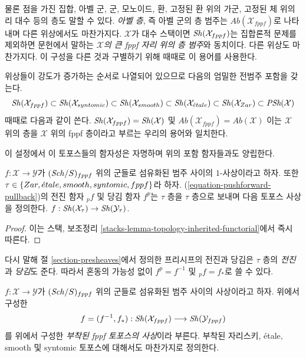 \noindent
물론 점을 가진 집합, 아벨 군, 군, 모노이드, 환, 고정된 환 위의
가군, 고정된 체 위의 리 대수 등의 층도 말할 수 있다. {\it 아벨 층},
즉 아벨 군의 층 범주는 $\textit{Ab}(\mathcal{X}_{fppf})$로 나타내며
다른 위상에서도 마찬가지다. $\mathcal{X}$가 대수 스택이면
$\mathop{\mathit{Sh}}\nolimits(\mathcal{X}_{fppf})$는 집합론적 문제를 제외하면 문헌에서
말하는 {\it $\mathcal{X}$의 큰 fppf 자리 위의 층 범주}와 동치이다.
다른 위상도 마찬가지다. 이 구성을 다른 것과 구별하기 위해 때때로
이 용어를 사용한다.

\medskip\noindent
위상들이 강도가 증가하는 순서로 나열되어 있으므로 다음의 엄밀한
전범주 포함을 갖는다.
$$
\mathop{\mathit{Sh}}\nolimits(\mathcal{X}_{fppf}) \subset
\mathop{\mathit{Sh}}\nolimits(\mathcal{X}_{syntomic}) \subset
\mathop{\mathit{Sh}}\nolimits(\mathcal{X}_{smooth}) \subset
\mathop{\mathit{Sh}}\nolimits(\mathcal{X}_{\acute{e}tale}) \subset
\mathop{\mathit{Sh}}\nolimits(\mathcal{X}_{Zar}) \subset \textit{PSh}(\mathcal{X})
$$
때때로 다음과 같이 쓴다.
$\mathop{\mathit{Sh}}\nolimits(\mathcal{X}_{fppf}) = \mathop{\mathit{Sh}}\nolimits(\mathcal{X})$
및
$\textit{Ab}(\mathcal{X}_{fppf}) = \textit{Ab}(\mathcal{X})$
이는 $\mathcal{X}$ 위의 층을 $\mathcal{X}$ 위의 fppf 층이라고 부르는
우리의 용어와 일치한다.

\medskip\noindent
이 설정에서 이 토포스들의 함자성은 자명하며 위의 포함 함자들과도
양립한다.

\begin{lemma}
\label{lemma-functoriality-sheaves}
$f : \mathcal{X} \to \mathcal{Y}$가 $(\mathit{Sch}/S)_{fppf}$ 위의 군들로
섬유화된 범주 사이의 $1$-사상이라고 하자. 또한
$\tau \in \{Zar, {\acute{e}tale}, smooth, syntomic, fppf\}$라 하자.
(\ref{equation-pushforward-pullback})의 전진 함자 ${}_pf$ 및
당김 함자 $f^p$는
$\tau$ 층을 $\tau$ 층으로 보내며 다음 토포스 사상을 정의한다.
$f : \mathop{\mathit{Sh}}\nolimits(\mathcal{X}_\tau) \to \mathop{\mathit{Sh}}\nolimits(\mathcal{Y}_\tau)$.
\end{lemma}

\begin{proof}
이는 스택, 보조정리 \ref{stacks-lemma-topology-inherited-functorial}에서
즉시 따른다.
\end{proof}

\noindent
다시 말해 절 \ref{section-presheaves}에서 정의한 프리시프의 전진과
당김은 $\tau$ 층의 {\it 전진}과 {\it 당김}도 준다. 따라서 혼동의
가능성 없이 $f^p = f^{-1}$ 및 $ {}_pf = f_*$로 쓸 수 있다.

\begin{definition}
\label{definition-morphism}
$f : \mathcal{X} \to \mathcal{Y}$가 $(\mathit{Sch}/S)_{fppf}$ 위의 군들로
섬유화된 범주 사이의 사상이라고 하자. 위에서 구성한
$$
f = (f^{-1}, f_*) :
\mathop{\mathit{Sh}}\nolimits(\mathcal{X}_{fppf})
\longrightarrow
\mathop{\mathit{Sh}}\nolimits(\mathcal{Y}_{fppf})
$$
를 위에서 구성한 {\it 부착된 fppf 토포스의 사상}이라 부른다.
부착된 자리스키, \'etale, smooth 및 syntomic 토포스에 대해서도
마찬가지로 정의한다.
\end{definition}

